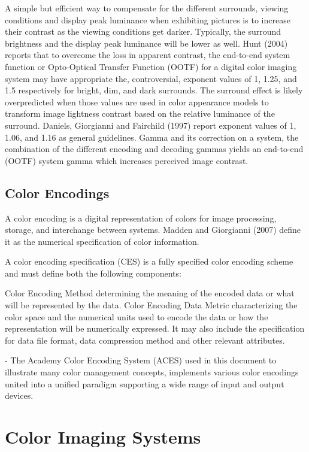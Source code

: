 A simple but efficient way to compensate for the different surrounds, viewing conditions and display peak luminance when exhibiting pictures is to increase their contrast as the viewing conditions get darker. Typically, the surround brightness and the display peak luminance will be lower as well. Hunt (2004) reports that to overcome the loss in apparent contrast, the end-to-end system function or Opto-Optical Transfer Function (OOTF) for a digital color imaging system may have appropriate the, controversial, exponent values of 1, 1.25, and 1.5 respectively for bright, dim, and dark surrounds. The surround effect is likely overpredicted when those values are used in color appearance models to transform image lightness contrast based on the relative luminance of the surround. Daniels, Giorgianni and Fairchild (1997) report exponent values of 1, 1.06, and 1.16 as general guidelines.
Gamma and its correction on a system, the combination of the different encoding and decoding gammas yields an end-to-end (OOTF) system gamma which increases perceived image contrast.

\subsection{Color Encodings}

A color encoding is a digital representation of colors for image processing, storage, and interchange between systems. Madden and Giorgianni (2007) define it as the numerical specification of color information.

A color encoding specification (CES) is a fully specified color encoding scheme and must define both the following components:

Color Encoding Method determining the meaning of the encoded data or what will be represented by the data.
Color Encoding Data Metric characterizing the color space and the numerical units used to encode the data or how the representation will be numerically expressed.
It may also include the specification for data file format, data compression method and other relevant attributes.

-
The Academy Color Encoding System (ACES) used in this document to illustrate many color management concepts, implements various color encodings united into a unified paradigm supporting a wide range of input and output devices.

\section{Color Imaging Systems}

